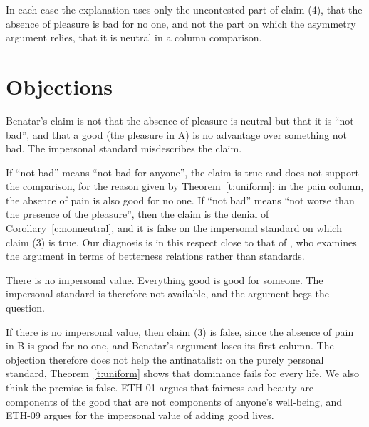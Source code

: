 \documentclass{situationist-preprint}
\begin{document}
In each case the explanation uses only the uncontested part of claim (4), that the absence of pleasure is bad for no one, and not the part on which the asymmetry argument relies, that it is neutral in a column comparison.

\section{Objections}

\begin{objection}
Benatar's claim is not that the absence of pleasure is neutral but that it is \enquote{not bad}, and that a good (the pleasure in A) is no advantage over something not bad. The impersonal standard misdescribes the claim.
\end{objection}

\begin{reply}
If \enquote{not bad} means \enquote{not bad for anyone}, the claim is true and does not support the comparison, for the reason given by Theorem~\ref{t:uniform}: in the pain column, the absence of pain is also good for no one. If \enquote{not bad} means \enquote{not worse than the presence of the pleasure}, then the claim is the denial of Corollary~\ref{c:nonneutral}, and it is false on the impersonal standard on which claim (3) is true. Our diagnosis is in this respect close to that of \citet{Bradley2010}, who examines the argument in terms of betterness relations rather than standards.
\end{reply}

\begin{objection}
There is no impersonal value. Everything good is good for someone. The impersonal standard is therefore not available, and the argument begs the question.
\end{objection}

\begin{reply}
If there is no impersonal value, then claim (3) is false, since the absence of pain in B is good for no one, and Benatar's argument loses its first column. The objection therefore does not help the antinatalist: on the purely personal standard, Theorem~\ref{t:uniform} shows that dominance fails for every life. We also think the premise is false. ETH-01 argues that fairness and beauty are components of the good that are not components of anyone's well-being, and ETH-09 argues for the impersonal value of adding good lives.
\end{reply}
\end{document}
